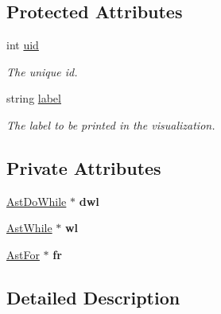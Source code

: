 \subsection*{Protected Attributes}
\begin{DoxyCompactItemize}
\item 
\hypertarget{classAST_a847b778f1c3dd5a19de32de432ee6e15}{int \hyperlink{classAST_a847b778f1c3dd5a19de32de432ee6e15}{uid}}\label{classAST_a847b778f1c3dd5a19de32de432ee6e15}

\begin{DoxyCompactList}\small\item\em The unique id. \end{DoxyCompactList}\item 
\hypertarget{classAST_ab2e239ccc0688d2341724432ff5a1a31}{string \hyperlink{classAST_ab2e239ccc0688d2341724432ff5a1a31}{label}}\label{classAST_ab2e239ccc0688d2341724432ff5a1a31}

\begin{DoxyCompactList}\small\item\em The label to be printed in the visualization. \end{DoxyCompactList}\end{DoxyCompactItemize}
\subsection*{Private Attributes}
\begin{DoxyCompactItemize}
\item 
\hypertarget{classAstIteration_a0edf707b0bd6eda8ddb07b515e826533}{\hyperlink{classAstDoWhile}{Ast\-Do\-While} $\ast$ {\bfseries dwl}}\label{classAstIteration_a0edf707b0bd6eda8ddb07b515e826533}

\item 
\hypertarget{classAstIteration_a6dfd671090cfb885a52004e6643232d6}{\hyperlink{classAstWhile}{Ast\-While} $\ast$ {\bfseries wl}}\label{classAstIteration_a6dfd671090cfb885a52004e6643232d6}

\item 
\hypertarget{classAstIteration_acccf81a8ef11c8fd8efc2425f91017e3}{\hyperlink{classAstFor}{Ast\-For} $\ast$ {\bfseries fr}}\label{classAstIteration_acccf81a8ef11c8fd8efc2425f91017e3}

\end{DoxyCompactItemize}


\subsection{Detailed Description}


